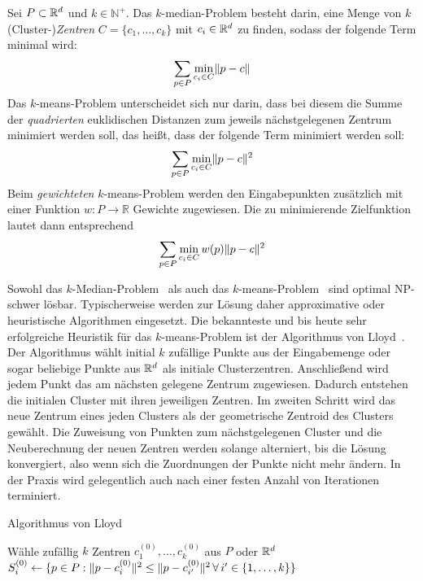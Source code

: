\begin{definition}
Sei $P \subset \mathbb{R}^{d}$ und $k \in \mathbb{N}^{+}$. Das $k$-median-Problem besteht darin, eine Menge von $k$ (Cluster-)\emph{Zentren}
$C = \{ c_1, \dots, c_k \}$ mit $c_i \in \mathbb{R}^{d}$ zu finden, sodass der folgende Term minimal wird:
\[ \sum_{p \in P} \min_{c_i \in C} \lVert {p} - {c} \rVert \]
Das $k$-means-Problem unterscheidet sich nur darin, dass bei diesem die Summe der \emph{quadrierten} euklidischen Distanzen
zum jeweils nächstgelegenen Zentrum minimiert werden soll, das heißt, dass der folgende Term minimiert werden soll:
\[ \sum_{p \in P} \min_{c_i \in C} \lVert {p} - {c} \rVert^2 \]
Beim \emph{gewichteten} $k$-means-Problem werden den Eingabepunkten zusätzlich mit einer Funktion $w : P \rightarrow \mathbb{R}$
Gewichte zugewiesen. Die zu minimierende Zielfunktion lautet dann entsprechend
\[ \sum_{p \in P} \min_{c_i \in C} w(p) \lVert {p} - {c} \rVert^2 \]
\end{definition}
Sowohl das $k$-Median-Problem~\cite{MegiddoS84} als auch das $k$-means-Problem~\cite{AloiseDHP09} sind optimal NP-schwer lösbar.
Typischerweise werden zur Lösung daher approximative oder heuristische Algorithmen eingesetzt. Die bekannteste und bis
heute sehr erfolgreiche Heuristik für das $k$-means-Problem ist der Algorithmus von Lloyd~\cite{Lloyd82}.
Der Algorithmus wählt initial $k$ zufällige Punkte aus der Eingabemenge oder sogar beliebige Punkte aus $\mathbb{R}^{d}$ als initiale
Clusterzentren. Anschließend wird jedem Punkt das am nächsten gelegene Zentrum zugewiesen. Dadurch entstehen die initialen Cluster
mit ihren jeweiligen Zentren. Im zweiten Schritt wird das neue Zentrum eines jeden Clusters als der geometrische Zentroid
des Clusters gewählt. Die Zuweisung von Punkten zum nächstgelegenen Cluster und die Neuberechnung der neuen Zentren werden
solange alterniert, bis die Lösung konvergiert, also wenn sich die Zuordnungen der Punkte nicht mehr ändern. In der Praxis
wird gelegentlich auch nach einer festen Anzahl von Iterationen terminiert.

\begin{algorithm}[H]
\label{algo:lloyd}
\caption{Algorithmus von Lloyd}
	\DontPrintSemicolon
	
	\BlankLine
	
	Wähle zufällig $k$ Zentren $c_1^{(0)}, \dots, c_k^{(0)}$ aus $P$ oder $\mathbb{R}^{d}$\;
	$S_i^{(0)} \leftarrow \{ p \in P : \lVert {p} - {c_i^{(0)}} \rVert^2 \leq \lVert {p} - {c_{i'}^{(0)}} \rVert^2 \, \forall \, i' \in \{ 1, \dots, k \} \}$\;
\end{algorithm}

